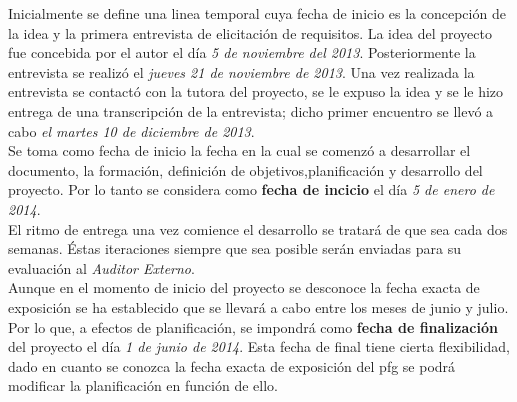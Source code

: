 
Inicialmente se define una linea temporal cuya fecha de inicio es la concepción de la idea y la primera entrevista de elicitación de requisitos. La idea del proyecto fue concebida por el autor el día \textit{5 de noviembre del 2013}. Posteriormente la entrevista se realizó el \textit{jueves 21 de noviembre de 2013}. Una vez realizada la entrevista se contactó con la tutora del proyecto, se le expuso la idea y se le hizo entrega de una transcripción de la entrevista; dicho primer encuentro se llevó a cabo \textit{el martes 10 de diciembre de 2013}. \\

Se toma como fecha de inicio la fecha en la cual se comenzó a desarrollar el documento, la formación, definición de objetivos,planificación y desarrollo del proyecto. Por lo tanto se considera como \textbf{fecha de incicio} el día \textit{5 de enero de 2014}. \\
 
El ritmo de entrega una vez comience el desarrollo se tratará de que sea cada dos semanas. Éstas iteraciones siempre que sea posible serán enviadas para su evaluación al \textit{Auditor Externo}. \\

Aunque en el momento de inicio del proyecto se desconoce la fecha exacta de exposición se ha establecido que se llevará a cabo entre los meses de junio y julio. Por lo que, a efectos de planificación, se impondrá como \textbf{fecha de finalización} del proyecto el día \textit{1 de junio de 2014}. Esta fecha de final tiene cierta flexibilidad, dado en cuanto se conozca la fecha exacta de exposición del pfg se podrá modificar la planificación en función de ello. \\

